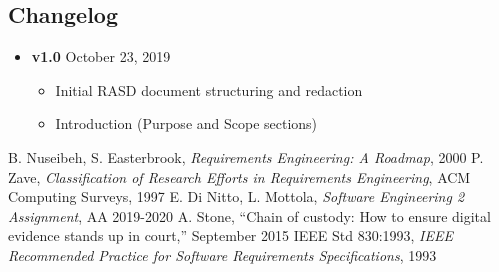 \begin{appendices}
	\section{Changelog}
	\begin{itemize}
		\item \textbf{v1.0} October 23, 2019
		\begin{itemize}
			\item Initial RASD document structuring and redaction
			\item Introduction (Purpose and Scope sections)
		\end{itemize}
	\end{itemize}
\end{appendices}

\clearpage

\begin{thebibliography}{9}

B. Nuseibeh, S. Easterbrook, \emph{Requirements Engineering: A Roadmap}, 2000
P. Zave, \emph{Classification of Research Efforts in Requirements
Engineering}, ACM Computing Surveys, 1997
 E. Di Nitto, L. Mottola, \emph{Software Engineering 2 Assignment}, AA 2019-2020
 A. Stone, “Chain of custody: How to ensure digital evidence stands up in court,” September 2015
IEEE Std 830:1993, \emph{IEEE Recommended Practice for Software Requirements Specifications}, 1993

\end{thebibliography}
